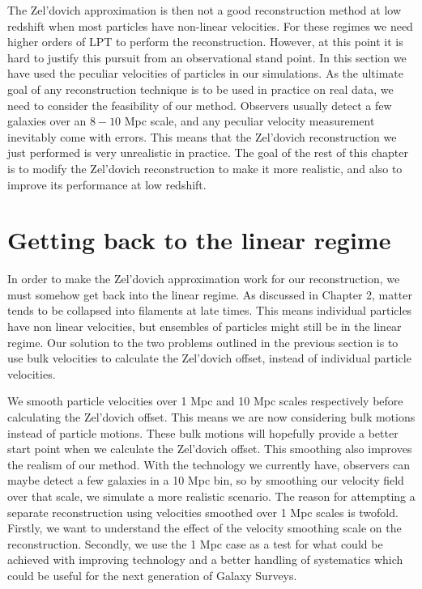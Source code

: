 The Zel'dovich approximation is then not a good reconstruction method at low redshift when most particles have non-linear velocities. For these regimes we need higher orders of LPT to perform the reconstruction. However, at this point it is hard to justify this pursuit from an observational stand point. In this section we have used the peculiar velocities of particles in our simulations. As the ultimate goal of any reconstruction technique is to be used in practice on real data, we need to consider the feasibility of our method. Observers usually detect a few galaxies over an $8-10$ Mpc scale, and any peculiar velocity measurement inevitably come with errors. This means that the Zel'dovich reconstruction we just performed is very unrealistic in practice. The goal of the rest of this chapter is to modify the Zel'dovich reconstruction to make it more realistic, and also to improve its performance at low redshift.

\section{Getting back to the linear regime}

In order to make the Zel'dovich approximation work for our reconstruction, we must somehow get back into the linear regime. As discussed in Chapter 2, matter tends to be collapsed into filaments at late times. This means individual particles have non linear velocities, but ensembles of particles might still be in the linear regime. Our solution to the two problems outlined in the previous section is to use bulk velocities to calculate the Zel'dovich offset, instead of individual particle velocities.

We smooth particle velocities over 1 Mpc and 10 Mpc scales respectively before calculating the Zel'dovich offset. This means we are now considering bulk motions instead of particle motions. These bulk motions will hopefully provide a better start point when we calculate the Zel'dovich offset. This smoothing also improves the realism of our method. With the technology we currently have, observers can maybe detect a few galaxies in a 10 Mpc bin, so by smoothing our velocity field over that scale, we simulate a more realistic scenario. The reason for attempting a separate reconstruction using velocities smoothed over 1 Mpc scales is twofold. Firstly, we want to understand the effect of the velocity smoothing scale on the reconstruction. Secondly, we use the 1 Mpc case as a test for what could be achieved with improving technology and a better handling of systematics which could be useful for the next generation of Galaxy Surveys.

